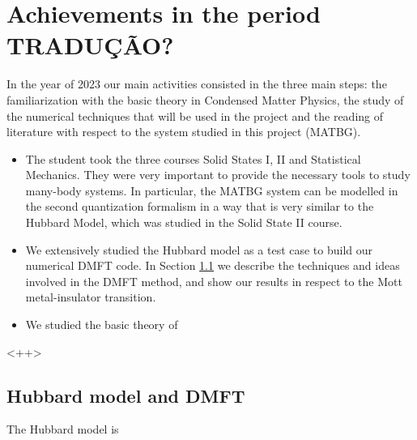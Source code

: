 \documentclass[12pt]{report}
\begin{document}
\chapter{Achievements in the period \textbf{TRADUÇÃO?}}

In the year of 2023 our main activities consisted in the three main steps: the familiarization with the basic theory in Condensed Matter Physics, the study of the numerical techniques that will be used in the project and the reading of literature with respect to the system studied in this project (MATBG).

\begin{itemize}
\item The student took the three courses Solid States I, II and Statistical Mechanics. They were very important to provide the necessary tools to study many-body systems. In particular, the MATBG system can be modelled in the second quantization formalism in a way that is very similar to the Hubbard Model, which was studied in the Solid State II course.

\item We extensively studied the Hubbard model \cite{hubbard1963} as a test case to build our numerical DMFT code. In Section \ref{sec:dmft} we describe the techniques and ideas involved in the DMFT method, and show our results in respect to the Mott metal-insulator transition.

\item We studied the basic theory of
\end{itemize}
<++>

\section{Hubbard model and DMFT} \label{sec:dmft}

The Hubbard model is
\end{document}
